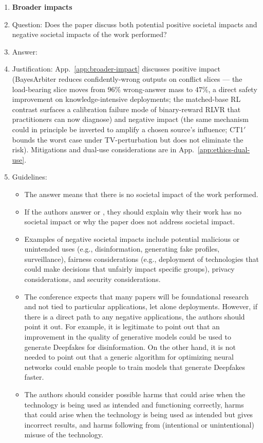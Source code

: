 \begin{enumerate}
\item \textbf{Broader impacts}
    \item[] Question: Does the paper discuss both potential positive societal impacts and negative societal impacts of the work performed?
    \item[] Answer: \answerYes{}
    \item[] Justification: App.~\ref{app:broader-impact} discusses positive impact (BayesArbiter reduces confidently-wrong outputs on conflict slices --- the load-bearing slice moves from $96\%$ wrong-answer mass to $47\%$, a direct safety improvement on knowledge-intensive deployments; the matched-base RL contrast surfaces a calibration failure mode of binary-reward RLVR that practitioners can now diagnose) and negative impact (the same mechanism could in principle be inverted to amplify a chosen source's influence; CT1$'$ bounds the worst case under TV-perturbation but does not eliminate the risk). Mitigations and dual-use considerations are in App.~\ref{app:ethics-dual-use}.
    \item[] Guidelines:
    \begin{itemize}
        \item The answer \answerNA{} means that there is no societal impact of the work performed.
        \item If the authors answer \answerNA{} or \answerNo{}, they should explain why their work has no societal impact or why the paper does not address societal impact.
        \item Examples of negative societal impacts include potential malicious or unintended uses (e.g., disinformation, generating fake profiles, surveillance), fairness considerations (e.g., deployment of technologies that could make decisions that unfairly impact specific groups), privacy considerations, and security considerations.
        \item The conference expects that many papers will be foundational research and not tied to particular applications, let alone deployments. However, if there is a direct path to any negative applications, the authors should point it out. For example, it is legitimate to point out that an improvement in the quality of generative models could be used to generate Deepfakes for disinformation. On the other hand, it is not needed to point out that a generic algorithm for optimizing neural networks could enable people to train models that generate Deepfakes faster.
        \item The authors should consider possible harms that could arise when the technology is being used as intended and functioning correctly, harms that could arise when the technology is being used as intended but gives incorrect results, and harms following from (intentional or unintentional) misuse of the technology.

\end{itemize}
\end{enumerate}
